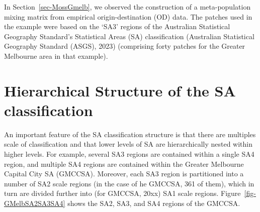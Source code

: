 \documentclass{monashthesis}
\begin{document}
In Section~\ref{sec-MossGmelb}, we observed the construction of a
meta-population mixing matrix from empirical origin-destination (OD)
data. The patches used in the example were based on the `SA3' regions of
the Australian Statistical Geography Standard's Statistical Areas (SA)
classification (Australian Statistical Geography Standard (ASGS), 2023)
(comprising forty patches for the Greater Melbourne area in that
example).

\hypertarget{hierarchical-structure-of-the-sa-classification}{%
\section{Hierarchical Structure of the SA
classification}\label{hierarchical-structure-of-the-sa-classification}}

An important feature of the SA classification structure is that there
are multiples scale of classification and that lower levels of SA are
hierarchically nested within higher levels. For example, several SA3
regions are contained within a single SA4 region, and multiple SA4
regions are contained within the Greater Melbourne Capital City SA
(GMCCSA). Moreover, each SA3 region is partitioned into a number of SA2
scale regions (in the case of he GMCCSA, 361 of them), which in turn are
divided further into (for GMCCSA, 20xx) SA1 scale regions.
Figure~\ref{fig-GMelbSA2SA3SA4} shows the SA2, SA3, and SA4 regions of
the GMCCSA.
\end{document}
